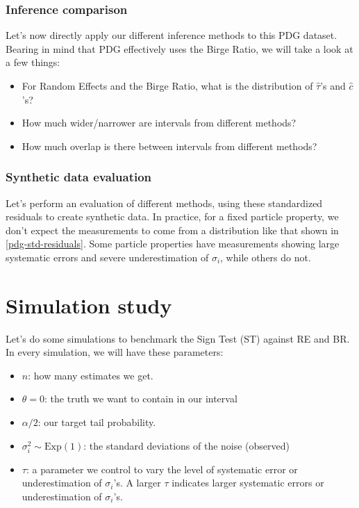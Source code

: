 \documentclass[letterpaper,12pt]{article}
\begin{document}
\subsubsection{Inference comparison}\label{inference-comparison}

Let's now directly apply our different inference methods to this PDG dataset. Bearing in mind that PDG effectively uses the Birge Ratio, we will take a look at a few things:

\begin{itemize}

\item
  For Random Effects and the Birge Ratio, what is the distribution of $\hat\tau$'s and $\hat c$'s?
\item
  How much wider/narrower are intervals from different methods?
\item
  How much overlap is there between intervals from different methods?
\end{itemize}

\subsubsection{Synthetic data evaluation}\label{synthetic-data-evaluation}

Let's perform an evaluation of different methods, using these standardized residuals to create synthetic data. In practice, for a fixed particle property, we don't expect the measurements to come from a distribution like that shown in \ref{pdg-std-residuals}. Some particle properties have measurements showing large systematic errors and severe underestimation of $\sigma_i$, while others do not.

\section{Simulation study}\label{sec:simulation}

Let's do some simulations to benchmark the Sign Test (ST) against RE and BR. In every simulation, we will have these parameters:

\begin{itemize}
\item
  $n$: how many estimates we get.
\item
  $\theta=0$: the truth we want to contain in our interval
\item
  $\alpha/2$: our target tail probability.
\item
  $\sigma_i^2\sim\mathrm{Exp}(1)$: the standard deviations of the
  noise (observed)
\item
  $\tau$: a parameter we control to vary the level of systematic error
  or underestimation of $\sigma_i$'s. A larger $\tau$ indicates larger
  systematic errors or underestimation of $\sigma_i$'s.
\end{itemize}
\end{document}
